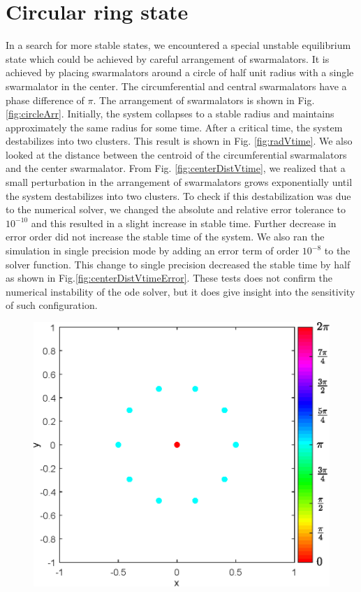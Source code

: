 \documentclass[superscriptaddress,reprint,amssymb, amsmath,aps, pre]{revtex4-1}
\begin{document}
\section{Circular ring state}
{
    In a search for more stable states, we encountered a special unstable equilibrium state which could be achieved by careful arrangement of swarmalators. It is achieved by placing swarmalators around a circle of half unit radius with a single swarmalator in the center. The circumferential and central swarmalators have a phase difference of \(\pi\). The arrangement of swarmalators is shown in Fig. \ref{fig:circleArr}. Initially, the system collapses to a stable radius and maintains approximately the same radius for some time. After a critical time, the system destabilizes into two clusters. This result is shown in Fig. \ref{fig:radVtime}. We also looked at the distance between the centroid of the circumferential swarmalators and the center swarmalator. From Fig. \ref{fig:centerDistVtime}, we realized that a small perturbation in the arrangement of swarmalators grows exponentially until the system destabilizes into two clusters. To check if this destabilization was due to the numerical solver, we changed the absolute and relative error tolerance to \(10^{-10}\) and this resulted in a slight increase in stable time. Further decrease in error order did not increase the stable time of the system. We also ran the simulation in single precision mode by adding an error term of order \(10^{-8}\) to the solver function. This change to single precision decreased the stable time by half as shown in Fig.\ref{fig:centerDistVtimeError}. These tests does not confirm the numerical instability of the ode solver, but it does give insight into the sensitivity of such configuration. 
    \begin{figure}
        \includegraphics[width = \linewidth]{circleArrangment.eps}

\end{figure}}
\end{document}
